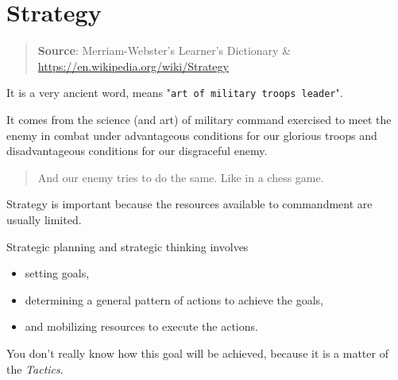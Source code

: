\section{Strategy}
\label{sec:Strategy}

\begin{quote}
\textbf{Source}: Merriam-Webster's Learner's Dictionary \& \url{https://en.wikipedia.org/wiki/Strategy}                                                  \end{quote} 

 It is a very ancient word, means "\texttt{art of military troops leader}". 

It comes from the science (and art) of military command exercised to meet the enemy in combat under advantageous conditions for our glorious troops and disadvantageous conditions for our disgraceful enemy. 

\begin{quote}
And our enemy tries to do the same. Like in a chess game.
\end{quote} 

Strategy is important because the resources available to commandment are usually limited.

Strategic planning and strategic thinking involves 
\begin{itemize}
\item 
setting goals, 
\item determining a general pattern of actions to achieve the goals, 
\item and mobilizing resources to execute the actions.                                                \end{itemize}

You don't really know how this goal will be achieved, because it is a matter of the \emph{Tactics}.
